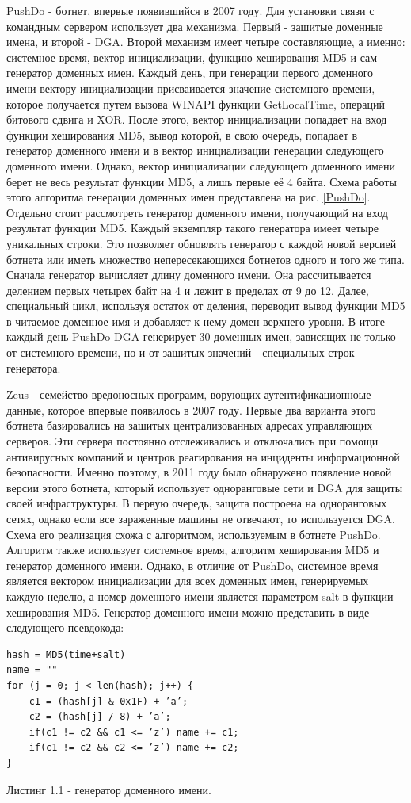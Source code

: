 PushDo - ботнет, впервые появившийся в 2007 году. Для установки связи с командным сервером использует два механизма. Первый - зашитые доменные имена, и второй - DGA. Второй механизм имеет четыре составляющие, а именно: системное время, вектор инициализации, функцию хеширования MD5 и сам генератор доменных имен. Каждый день, при генерации первого доменного имени вектору инициализации присваивается значение системного времени, которое получается путем вызова WINAPI функции GetLocalTime, операций битового сдвига и XOR. После этого, вектор инициализации попадает на вход функции хеширования MD5, вывод которой, в свою очередь, попадает в генератор доменного имени и в вектор инициализации генерации следующего доменного имени. Однако, вектор инициализации следующего доменного имени берет не весь результат функции MD5, а лишь первые её 4 байта. Схема работы этого алгоритма генерации доменных имен представлена на рис. \ref{PushDo}.
Отдельно стоит рассмотреть генератор доменного имени, получающий на вход результат функции MD5. Каждый экземпляр такого генератора имеет четыре уникальных строки. Это позволяет обновлять генератор с каждой новой версией ботнета или иметь множество непересекающихся ботнетов одного и того же типа. Сначала генератор вычисляет длину доменного имени. Она рассчитывается делением первых четырех байт на 4 и лежит в пределах от 9 до 12. Далее, специальный цикл, используя остаток от деления, переводит вывод функции MD5 в читаемое доменное имя и добавляет к нему домен верхнего уровня. В итоге каждый день PushDo DGA генерирует 30 доменных имен, зависящих не только от системного времени, но и от зашитых значений - специальных строк генератора.

Zeus - семейство вредоносных программ, ворующих аутентификационноые данные, которое впервые появилось в 2007 году. Первые два варианта этого ботнета базировались на зашитых централизованных адресах управляющих серверов. Эти сервера постоянно отслеживались и отключались при помощи антивирусных компаний и центров реагирования на инциденты информационной безопасности. Именно поэтому, в 2011 году было обнаружено появление новой версии этого ботнета, который использует одноранговые сети и DGA для защиты своей инфраструктуры. В первую очередь, защита построена на одноранговых сетях, однако если все зараженные машины не отвечают, то используется DGA. Схема его реализация схожа с алгоритмом, используемым в ботнете PushDo. Алгоритм также использует системное время, алгоритм хеширования MD5 и генератор доменного имени. Однако, в отличие от PushDo, системное время является вектором инициализации для всех доменных имен, генерируемых каждую неделю, а номер доменного имени является параметром salt в функции хеширования MD5. Генератор доменного имени можно представить в виде следующего псевдокода:
\clearpage
\begin{lstlisting}
hash = MD5(time+salt)
name = ""
for (j = 0; j < len(hash); j++) {
    c1 = (hash[j] & 0x1F) + ’a’;
    c2 = (hash[j] / 8) + ’a’;
    if(c1 != c2 && c1 <= ’z’) name += c1;
    if(c1 != c2 && c2 <= ’z’) name += c2;
}
\end{lstlisting}
Листинг 1.1 - генератор доменного имени.

